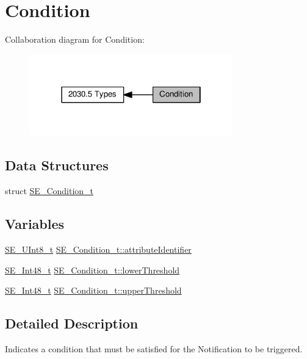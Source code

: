 \hypertarget{group__Condition}{}\section{Condition}
\label{group__Condition}
Collaboration diagram for Condition\+:\nopagebreak
\begin{figure}[H]
\begin{center}
\leavevmode
\includegraphics[width=250pt]{group__Condition}
\end{center}
\end{figure}
\subsection*{Data Structures}
\begin{DoxyCompactItemize}
\item 
struct \hyperlink{structSE__Condition__t}{S\+E\+\_\+\+Condition\+\_\+t}
\end{DoxyCompactItemize}
\subsection*{Variables}
\begin{DoxyCompactItemize}
\item 
\hyperlink{group__UInt8_gaf7c365a1acfe204e3a67c16ed44572f5}{S\+E\+\_\+\+U\+Int8\+\_\+t} \hyperlink{group__Condition_ga0593335fc293cfbf8098ec85166a1d5b}{S\+E\+\_\+\+Condition\+\_\+t\+::attribute\+Identifier}
\item 
\hyperlink{group__Int48_ga87620025dc9f6c732fa48fcab95861ce}{S\+E\+\_\+\+Int48\+\_\+t} \hyperlink{group__Condition_ga2b9831b649bb55a903934573c172e6a7}{S\+E\+\_\+\+Condition\+\_\+t\+::lower\+Threshold}
\item 
\hyperlink{group__Int48_ga87620025dc9f6c732fa48fcab95861ce}{S\+E\+\_\+\+Int48\+\_\+t} \hyperlink{group__Condition_gacf1c0d2295665c535d75ae480fa2e373}{S\+E\+\_\+\+Condition\+\_\+t\+::upper\+Threshold}
\end{DoxyCompactItemize}


\subsection{Detailed Description}
Indicates a condition that must be satisfied for the Notification to be triggered. 

